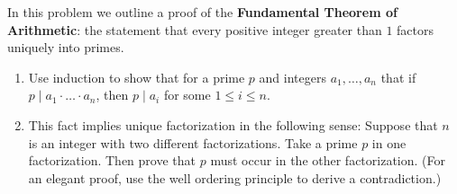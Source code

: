 In this problem we outline a proof of the \textbf{Fundamental Theorem of Arithmetic}: the statement that every positive integer greater than $1$ factors uniquely into primes.
\begin{enumerate}
	\item Use induction to show that for a prime $p$ and integers $a_1, \dots, a_n$ that if $p \mid a_1\cdot \dots\cdot a_n$, then $p \mid a_i$ for some $1 \leq i \leq n$. 
	\item This fact implies unique factorization in the following sense: Suppose that $n$ is an integer with two different factorizations. Take a prime $p$ in one factorization. Then prove that $p$ must occur in the other factorization. (For an elegant proof, use the well ordering principle to derive a contradiction.)
\end{enumerate}